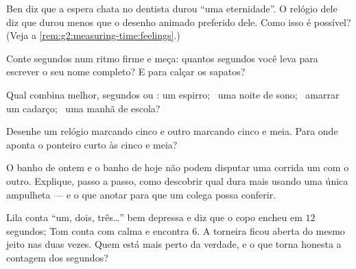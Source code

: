 \begin{exercise}[$\star$]\label{exo:g2:measuring-time:5}
Ben diz que a espera chata no dentista durou ``uma eternidade''. O
relógio dele diz que durou menos que o desenho animado preferido
dele. Como isso é possível? (Veja a
\cref{rem:g2:measuring-time:feelings}.)
\end{exercise}

\begin{exercise}[$\star$]\label{exo:g2:measuring-time:6}
Conte segundos num ritmo firme e meça: quantos segundos você leva
para escrever o seu nome completo? E para calçar os sapatos?
\end{exercise}

\begin{exercise}[$\star$]\label{exo:g2:measuring-time:7}
Qual  combina melhor, segundos ou : um espirro; \ uma
noite de sono; \ amarrar um cadarço; \ uma manhã de escola?
\end{exercise}

\begin{exercise}[$\star$]\label{exo:g2:measuring-time:8}
Desenhe um relógio marcando cinco  e outro marcando cinco e
meia. Para onde aponta o ponteiro curto às cinco e meia?
\end{exercise}

\begin{exercise}[$\star\star$]\label{exo:g2:measuring-time:9}
O banho de ontem e o banho de hoje não podem disputar uma corrida um
com o outro. Explique, passo a passo, como descobrir qual dura mais
usando uma única ampulheta --- e o que anotar para que um colega
possa conferir.
\end{exercise}

\begin{exercise}[$\star\star$]\label{exo:g2:measuring-time:10}
Lila conta ``um, dois, três\dots'' bem depressa e diz que o copo
encheu em $12$ segundos; Tom conta com calma e encontra $6$. A
torneira ficou aberta do mesmo jeito nas duas vezes. Quem está mais
perto da verdade, e o que torna honesta a contagem dos segundos?
\end{exercise}

